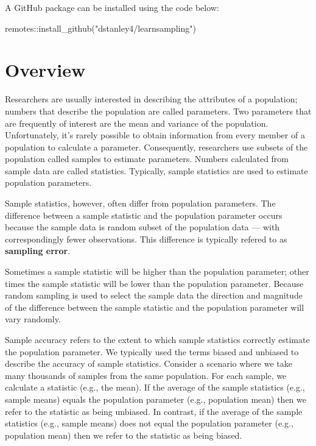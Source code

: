 \documentclass[
]{krantz}
\makeatletter
\newenvironment{Shaded}{\begin{snugshade}}{\end{snugshade}}
\newcommand{\FunctionTok}[1]{\textcolor[rgb]{0,0,0}{#1}}
\newcommand{\NormalTok}[1]{#1}
\newcommand{\SpecialCharTok}[1]{\textcolor[rgb]{0,0,0}{#1}}
\newcommand{\StringTok}[1]{\textcolor[rgb]{0.5,0.5,0.5}{#1}}
\newenvironment{kframe}{%
\medskip{}
\setlength{\fboxsep}{.8em}
 \def\at@end@of@kframe{}%
 \ifinner\ifhmode%
  \def\at@end@of@kframe{\end{minipage}}%
  \begin{minipage}{\columnwidth}%
 \fi\fi%
 \def\FrameCommand##1{\hskip\@totalleftmargin \hskip-\fboxsep
 \colorbox{shadecolor}{##1}\hskip-\fboxsep
     \hskip-\linewidth \hskip-\@totalleftmargin \hskip\columnwidth}%
 \MakeFramed {\advance\hsize-\width
   \@totalleftmargin\z@ \linewidth\hsize
   \@setminipage}}%
 {\par\unskip\endMakeFramed%
 \at@end@of@kframe}
\renewenvironment{Shaded}{\begin{kframe}}{\end{kframe}}
\makeatother
\begin{document}
A GitHub package can be installed using the code below:

\begin{Shaded}
\begin{Highlighting}[]
\NormalTok{remotes}\SpecialCharTok{::}\FunctionTok{install\_github}\NormalTok{(}\StringTok{"dstanley4/learnsampling"}\NormalTok{)}
\end{Highlighting}
\end{Shaded}

\hypertarget{overview-1}{%
\section{Overview}\label{overview-1}}

Researchers are usually interested in describing the attributes of a population; numbers that describe the population are called parameters. Two parameters that are frequently of interest are the mean and variance of the population. Unfortunately, it's rarely possible to obtain information from every member of a population to calculate a parameter. Consequently, researchers use subsets of the population called samples to estimate parameters. Numbers calculated from sample data are called statistics. Typically, sample statistics are used to estimate population parameters.

Sample statistics, however, often differ from population parameters. The difference between a sample statistic and the population parameter occurs because the sample data is random subset of the population data --- with correspondingly fewer observations. This difference is typically refered to as \textbf{sampling error}.

Sometimes a sample statistic will be higher than the population parameter; other times the sample statistic will be lower than the population parameter. Because random sampling is used to select the sample data the direction and magnitude of the difference between the sample statistic and the population parameter will vary randomly.

Sample accuracy refers to the extent to which sample statistics correctly estimate the population parameter. We typically used the terms biased and unbiased to describe the accuracy of sample statistics. Consider a scenario where we take many thousands of samples from the same population. For each sample, we calculate a statistic (e.g., the mean). If the average of the sample statistics (e.g., sample means) equals the population parameter (e.g., population mean) then we refer to the statistic as being unbiased. In contrast, if the average of the sample statistics (e.g., sample means) does not equal the population parameter (e.g., population mean) then we refer to the statistic as being biased.
\end{document}
